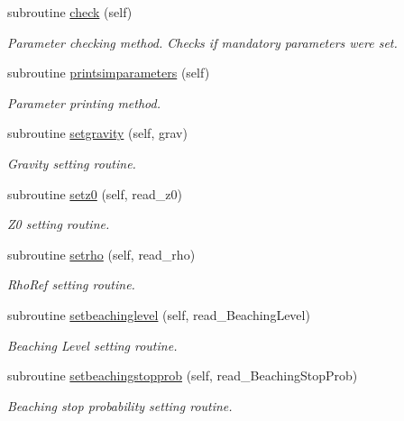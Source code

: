\begin{DoxyCompactItemize}
subroutine \mbox{\hyperlink{namespacesimulationglobals__mod_a3d337e9c28136dd9c67fa576f05cd44b}{check}} (self)
\begin{DoxyCompactList}\small\item\em Parameter checking method. Checks if mandatory parameters were set. \end{DoxyCompactList}\item 
subroutine \mbox{\hyperlink{namespacesimulationglobals__mod_ab67964fe7c3fb20a4ce0b4193520aa1d}{printsimparameters}} (self)
\begin{DoxyCompactList}\small\item\em Parameter printing method. \end{DoxyCompactList}\item 
subroutine \mbox{\hyperlink{namespacesimulationglobals__mod_ae6b88d15ddc389aedd73d600de0337df}{setgravity}} (self, grav)
\begin{DoxyCompactList}\small\item\em Gravity setting routine. \end{DoxyCompactList}\item 
subroutine \mbox{\hyperlink{namespacesimulationglobals__mod_a36c2833caae3767434115cc966fe2c5d}{setz0}} (self, read\+\_\+z0)
\begin{DoxyCompactList}\small\item\em Z0 setting routine. \end{DoxyCompactList}\item 
subroutine \mbox{\hyperlink{namespacesimulationglobals__mod_a7d41fc05216d326ae8c0b090362430d3}{setrho}} (self, read\+\_\+rho)
\begin{DoxyCompactList}\small\item\em Rho\+Ref setting routine. \end{DoxyCompactList}\item 
subroutine \mbox{\hyperlink{namespacesimulationglobals__mod_a3b24d0338ee34782c8e2ab57bba7b5f6}{setbeachinglevel}} (self, read\+\_\+\+Beaching\+Level)
\begin{DoxyCompactList}\small\item\em Beaching Level setting routine. \end{DoxyCompactList}\item 
subroutine \mbox{\hyperlink{namespacesimulationglobals__mod_aacd46eb198a99699d7be61b807363fc6}{setbeachingstopprob}} (self, read\+\_\+\+Beaching\+Stop\+Prob)
\begin{DoxyCompactList}\small\item\em Beaching stop probability setting routine. \end{DoxyCompactList}\item 

\end{DoxyCompactItemize}
